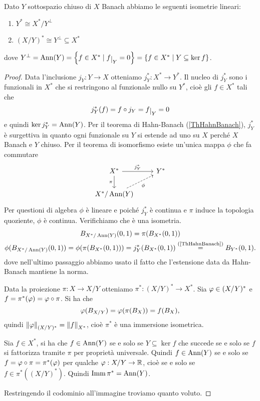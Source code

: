 \begin{proposition}\label{PrDualeDiSottospaziEDualeQuoziente}
Dato $Y$ sottospazio chiuso di $X$ Banach abbiamo le seguenti isometrie lineari:
\begin{enumerate}
    \item $Y^\ast\cong X^\ast/Y^\perp$
    \item $(X/Y)^\ast\cong Y^\perp\subseteq X^\ast$
\end{enumerate}
dove $Y^\perp=\Ann(Y)=\cpa{f\in X^\ast\mid f\res Y=0}=\cpa{f\in X^\ast\mid Y\subseteq \ker f}$.
\end{proposition}
\begin{proof}
Data l'inclusione $j_Y:Y\to X$ otteniamo $j_Y^\ast:X^\ast\to Y^\ast$. Il nucleo di $j_Y^\ast$ sono i funzionali in $X^\ast$ che si restringono al funzionale nullo su $Y^\ast$, cio\`e gli $f\in X^\ast$ tali che \[j_Y^\ast(f)=f\circ j_Y=f\res Y=0\] e quindi $\ker j_Y^\ast=\Ann(Y)$. Per il teorema di Hahn-Banach (\ref{ThHahnBanach}), $j_Y^\ast$ \`e surgettiva in quanto ogni funzionale su $Y$ si estende ad uno su $X$ perch\'e $X$ Banach e $Y$ chiuso. Per il teorema di isomorfismo esiste un'unica mappa $\phi$ che fa commutare
\[\begin{tikzcd}
	{X^\ast} & {Y^\ast} \\
	{X^\ast/\Ann(Y)}
	\arrow["{j_Y^\ast}", from=1-1, to=1-2]
	\arrow["\pi"', from=1-1, to=2-1]
	\arrow["\phi"', dashed, from=2-1, to=1-2]
\end{tikzcd}\]
Per questioni di algebra $\phi$ \`e lineare e poich\'e $j_Y^\ast$ \`e continua e $\pi$ induce la topologia quoziente, $\phi$ \`e continua. Verifichiamo che \`e una isometria.
\begin{gather*}
    B_{X^\ast/\Ann(Y)}(0,1)=\pi(B_{X^\ast}(0,1))\\
    \phi(B_{X^\ast/\Ann(Y)}(0,1))=\phi(\pi(B_{X^\ast}(0,1)))=j_Y^\ast(B_{X^\ast}(0,1))\pasgnl={(\ref{ThHahnBanach})}B_{Y^\ast}(0,1).
\end{gather*}
dove nell'ultimo passaggio abbiamo usato il fatto che l'estensione data da Hahn-Banach mantiene la norma.

\bigskip
\noindent
Data la proiezione $\pi:X\to X/Y$ otteniamo $\pi^\ast:(X/Y)^\ast\to X^\ast$.
Sia $\vp\in(X/Y)^\ast$ e $f=\pi^\ast(\vp)=\vp\circ \pi$. Si ha che
\[\vp(B_{X/Y})=\vp(\pi(B_X))=f(B_X),\]
quindi $\norm\vp_{(X/Y)^\ast}=\norm f_{X^\ast}$, cio\`e $\pi^\ast$ \`e una immersione isometrica.

Sia $f\in X^\ast$, si ha che $f\in\Ann(Y)$ se e solo se $Y\subseteq \ker f$ che succede se e solo se $f$ si fattorizza tramite $\pi$ per propriet\`a universale. Quindi $f\in \Ann(Y)$ se e solo se $f=\vp\circ \pi=\pi^\ast(\vp)$ per qualche $\vp:X/Y\to \R$, cio\`e se e solo se $f\in \pi^\ast((X/Y)^\ast)$. Quindi $\imm \pi^\ast=\Ann(Y)$.

Restringendo il codominio all'immagine troviamo quanto voluto.
\end{proof}

